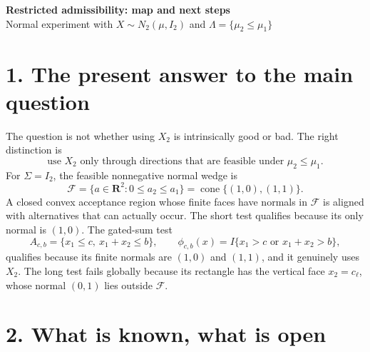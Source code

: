 \documentclass[10pt]{article}
\begin{document}
\begin{center}
{\large \bf Restricted admissibility: map and next steps}\\[-1pt]
{\small Normal experiment with $X\sim N_2(\mu,I_2)$ and $\Lambda=\{\mu_2\le\mu_1\}$}
\end{center}

\section*{1. The present answer to the main question}

The question is not whether using $X_2$ is intrinsically good or bad. The right distinction is
\[
\boxed{\text{use $X_2$ only through directions that are feasible under }\mu_2\le\mu_1.}
\]
For $\Sigma=I_2$, the feasible nonnegative normal wedge is
\[
\mathcal F=\{a\in\mathbf R^2:0\le a_2\le a_1\}=\operatorname{cone}\{(1,0),(1,1)\}.
\]
A closed convex acceptance region whose finite faces have normals in $\mathcal F$ is aligned with alternatives that can actually occur.  The short test qualifies because its only normal is $(1,0)$.  The gated-sum test
\[
A_{c,b}=\{x_1\le c,\ x_1+x_2\le b\},
\qquad
\phi_{c,b}(x)=I\{x_1>c\text{ or }x_1+x_2>b\},
\]
qualifies because its finite normals are $(1,0)$ and $(1,1)$, and it genuinely uses $X_2$.  The long test fails globally because its rectangle has the vertical face $x_2=c_\ell$, whose normal $(0,1)$ lies outside $\mathcal F$.

\section*{2. What is known, what is open}
\end{document}
